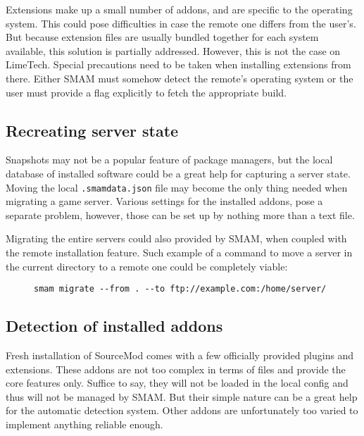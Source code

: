 Extensions make up a small number of addons, and are specific to the operating system.
This could pose difficulties in case the remote one differs from the user's.
But because extension files are usually bundled together for each system available, this solution is partially addressed.
However, this is not the case on LimeTech.
Special precautions need to be taken when installing extensions from there.
Either SMAM must somehow detect the remote's operating system or the user must provide a flag explicitly to fetch the appropriate build.

\subsection{Recreating server state}

Snapshots may not be a popular feature of package managers, but the local database of installed software could be a great help for capturing a server state.
Moving the local \verb|.smamdata.json| file may become the only thing needed when migrating a game server.
Various settings for the installed addons, pose a separate problem, however, those can be set up by nothing more than a text file.

Migrating the entire servers could also provided by SMAM, when coupled with the remote installation feature.
Such example of a command to move a server in the current directory to a remote one could be completely viable:

\begin{figure}[htp]
\centering
\verb|smam migrate --from . --to ftp://example.com:/home/server/|
\end{figure}

\subsection{Detection of installed addons}

Fresh installation of SourceMod comes with a few officially provided plugins and extensions.
These addons are not too complex in terms of files and provide the core features only.
Suffice to say, they will not be loaded in the local config and thus will not be managed by SMAM\@.
But their simple nature can be a great help for the automatic detection system.
Other addons are unfortunately too varied to implement anything reliable enough.
